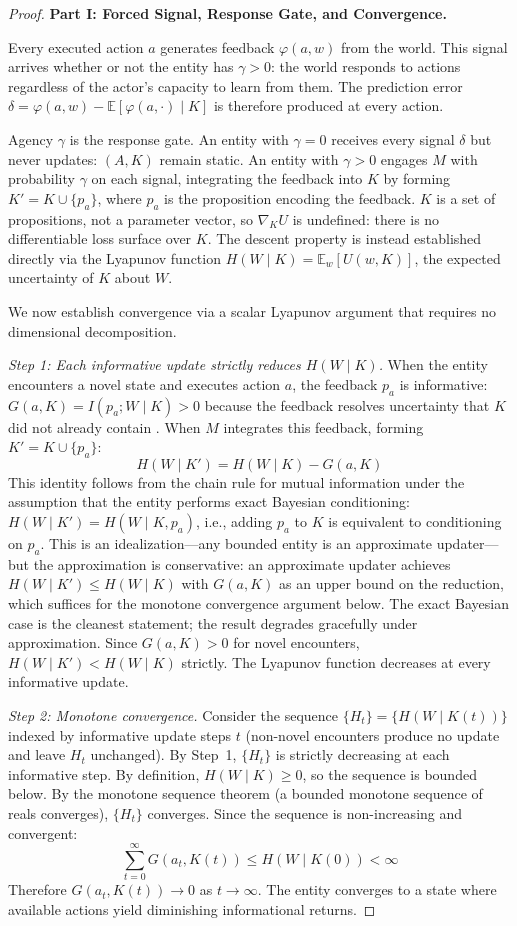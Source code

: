 \documentclass[11pt]{article}
\theoremstyle{definition}
\begin{document}
\begin{proof}
\textbf{Part I: Forced Signal, Response Gate, and Convergence.}

Every executed action $a$ generates feedback $\varphi(a, w)$ from the
world. This signal arrives whether or not the entity has $\gamma > 0$: the
world responds to actions regardless of the actor's capacity to learn
from them. The prediction error $\delta = \varphi(a, w) -
\mathbb{E}[\varphi(a, \cdot) \mid K]$ is therefore produced at every
action.

Agency $\gamma$ is the response gate. An entity with $\gamma = 0$ receives
every signal $\delta$ but never updates: $(A, K)$ remain static. An
entity with $\gamma > 0$ engages $M$ with probability $\gamma$ on each
signal, integrating the feedback into $K$ by forming
$K' = K \cup \{p_a\}$, where $p_a$ is the proposition encoding the
feedback. $K$ is a set of propositions, not a parameter vector, so
$\nabla_K U$ is undefined: there is no differentiable loss surface over
$K$. The descent property is instead established directly via the
Lyapunov function $H(W \mid K) = \mathbb{E}_w[U(w, K)]$, the expected
uncertainty of $K$ about $W$.

We now establish convergence via a scalar Lyapunov argument that
requires no dimensional decomposition.

\emph{Step 1: Each informative update strictly reduces $H(W \mid K)$.}
When the entity encounters a novel state and executes action $a$, the
feedback $p_a$ is informative: $G(a, K) = I(p_a; W \mid K) > 0$
because the feedback resolves uncertainty that $K$ did not already
contain \cite{Cover2006}. When $M$ integrates this feedback, forming
$K' = K \cup \{p_a\}$:
\[
H(W \mid K') = H(W \mid K) - G(a, K)
\]
This identity follows from the chain rule for mutual information under
the assumption that the entity performs exact Bayesian conditioning:
$H(W \mid K') = H(W \mid K, p_a)$, i.e., adding $p_a$ to $K$ is
equivalent to conditioning on $p_a$. This is an idealization---any
bounded entity is an approximate updater---but the approximation is
conservative: an approximate updater achieves $H(W \mid K') \leq
H(W \mid K)$ with $G(a,K)$ as an upper bound on the reduction, which
suffices for the monotone convergence argument below. The exact
Bayesian case is the cleanest statement; the result degrades gracefully
under approximation.
Since $G(a, K) > 0$ for novel encounters, $H(W \mid K') < H(W \mid K)$
strictly. The Lyapunov function decreases at every informative update.

\emph{Step 2: Monotone convergence.} Consider the sequence
$\{H_t\} = \{H(W \mid K(t))\}$ indexed by informative update steps
$t$ (non-novel encounters produce no update and leave $H_t$
unchanged). By Step~1, $\{H_t\}$ is strictly decreasing at each
informative step. By definition, $H(W \mid K) \geq 0$, so the
sequence is bounded below. By the monotone sequence theorem (a bounded monotone sequence of reals
converges),
$\{H_t\}$ converges. Since the sequence is non-increasing and
convergent:
\[
\sum_{t=0}^{\infty} G(a_t, K(t)) \leq H(W \mid K(0)) < \infty
\]
Therefore $G(a_t, K(t)) \to 0$ as $t \to \infty$. The entity
converges to a state where available actions yield diminishing
informational returns.


\end{proof}
\end{document}
